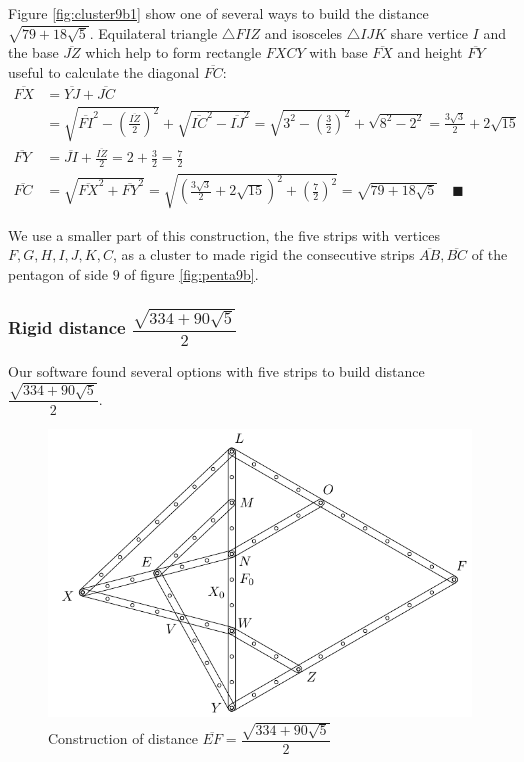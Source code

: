 \documentclass[11pt]{article}
\begin{document}
Figure \ref{fig:cluster9b1} show one of several ways to build the distance $\sqrt{79 + 18\sqrt5}$. 
Equilateral triangle $\triangle{FIZ}$ and isosceles $\triangle{IJK}$ share vertice $I$ and the base $\overline{JZ}$ which help to form rectangle $FXCY$ with base $\overline{FX}$ and height $\overline{FY}$ useful to calculate the diagonal $\overline{FC}$:
\begin{align}
\overline{FX} &= \overline{YJ} + \overline{JC}\nonumber\\
 &= \sqrt{\overline{FI}^2 - \left(\frac{\overline{IZ}}2\right)^2}
  + \sqrt{\overline{IC}^2 - \overline{IJ}^2}
  = \sqrt{3^2 - \left(\frac{3}2\right)^2} + \sqrt{8^2 - 2^2} 
  = \frac{3\sqrt3}2 + 2\sqrt{15} \nonumber\\
\overline{FY} &= \overline{JI} + \frac{\overline{IZ}}2
  = 2 + \frac{3}2 = \frac{7}2 \nonumber\\
\overline{FC} &= \sqrt{\overline{FX}^2 + \overline{FY}^2}
 = \sqrt{\left(\frac{3\sqrt3}2 + 2\sqrt{15}\right)^2 + \left(\frac{7}2\right)^2}
 = \sqrt{79 + 18\sqrt5} \quad\blacksquare
\end{align}

We use a smaller part of this construction, the five strips with vertices $F,G,H,I,J,K,C$, as a cluster to made rigid the consecutive strips $\overline{AB},\overline{BC}$ of the pentagon of side $9$ of figure \ref{fig:penta9b}.


\subsubsection{Rigid distance $\dfrac{\sqrt{334 + 90\sqrt5}}2$}

Our software found several options with five strips to build distance$\dfrac{\sqrt{334 + 90\sqrt5}}2$.

\begin{figure}[H]
\centering
\includegraphics[scale=1]{9/cluster9b2}
\caption{Construction of distance $\overline{EF}=\dfrac{\sqrt{334 + 90\sqrt5}}2$}
\label{fig:cluster9b2}
\end{figure}
\end{document}
